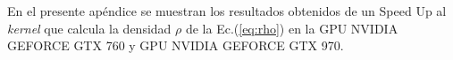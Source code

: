 \chapter{}
\label{ap_python}

En el presente apéndice se muestran los resultados obtenidos de un Speed Up al \textit{kernel} que calcula la densidad $\rho$ de la Ec.(\ref{eq:rho}) en la
GPU NVIDIA GEFORCE GTX 760 y GPU NVIDIA GEFORCE GTX 970.







